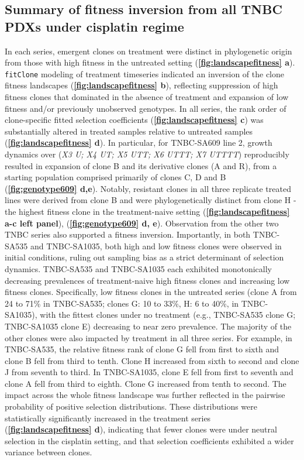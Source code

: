 \subsection{Summary of fitness inversion from all TNBC PDXs under cisplatin regime}
In each series, emergent clones on treatment were distinct in phylogenetic origin from those with high fitness in the untreated setting (\textbf{\autoref{fig:landscapefitness} a}). \texttt{fitClone} modeling of treatment timeseries indicated an inversion of the clone fitness landscapes (\textbf{\autoref{fig:landscapefitness} b}), reflecting suppression of high fitness clones that dominated in the absence of treatment and expansion of low fitness and/or previously unobserved genotypes. In all series, the rank order of clone-specific fitted selection coefficients (\textbf{\autoref{fig:landscapefitness} c}) was substantially altered in treated samples relative to untreated samples (\textbf{\autoref{fig:landscapefitness} d}). In particular, for TNBC-SA609 line 2, growth dynamics over (\textit{X3 U; X4 UT; X5 UTT; X6 UTTT; X7 UTTTT}) reproducibly resulted in expansion of clone B and its derivative clones (A and R), from a starting population comprised primarily of clones C, D and B (\textbf{\autoref{fig:genotype609} d,e}). Notably, resistant clones in all three replicate treated lines were derived from clone B and were phylogenetically distinct from clone H - the highest fitness clone in the treatment-naive setting  (\textbf{\autoref{fig:landscapefitness} a-c left panel}), (\textbf{\autoref{fig:genotype609} d, e}). Observation from the other two TNBC series also supported a fitness inversion. Importantly, in both TNBC-SA535 and TNBC-SA1035, both high and low fitness clones were observed in initial conditions, ruling out sampling bias as a strict determinant of selection dynamics. TNBC-SA535 and TNBC-SA1035 each exhibited monotonically decreasing prevalences of treatment-naive high fitness clones and increasing low fitness clones. Specifically, low fitness clones in the untreated series (clone A from 24 to 71\% in TNBC-SA535; clones G: 10 to 33\%, H: 6 to 40\%, in TNBC-SA1035), with the fittest clones under no treatment (e.g., TNBC-SA535 clone G; TNBC-SA1035 clone E) decreasing to near zero prevalence. The majority of the other clones were also impacted by treatment in all three series. For example, in TNBC-SA535, the relative fitness rank of clone G fell from first to sixth and clone B fell from third to tenth. Clone H increased from sixth to second and clone J from seventh to third. In TNBC-SA1035, clone E fell from first to seventh and clone A fell from third to eighth. Clone G increased from tenth to second. The impact across the whole fitness landscape was further reflected in the pairwise probability of positive selection distributions. These distributions were statistically significantly increased in the treatment series  (\textbf{\autoref{fig:landscapefitness} d}), indicating that fewer clones were under neutral selection in the cisplatin setting, and that selection coefficients exhibited a wider variance between clones. 
